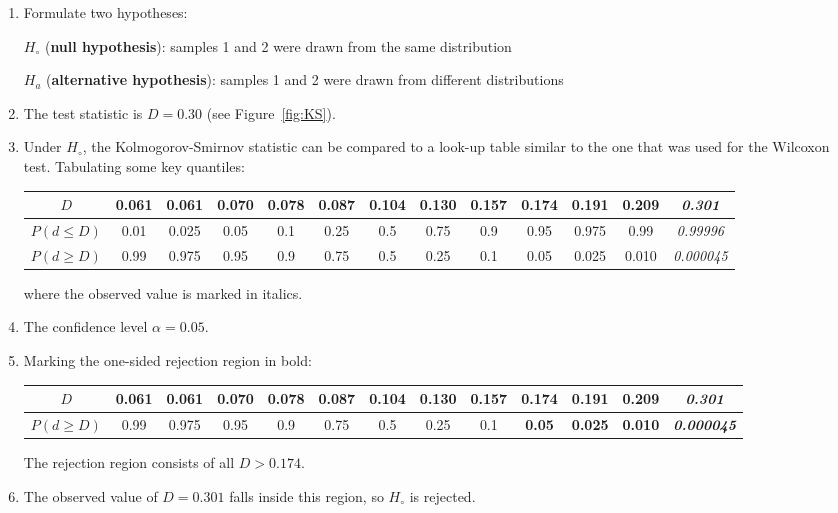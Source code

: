 \begin{enumerate}
\item  Formulate two hypotheses:

  $H_\circ$ (\textbf{null hypothesis}):
  samples 1 and 2 were drawn from the same distribution

  $H_a$ (\textbf{alternative hypothesis}):
  samples 1 and 2 were drawn from different distributions
  
\item The test statistic is $D=0.30$ (see Figure~\ref{fig:KS}).

\item Under $H_\circ$, the Kolmogorov-Smirnov statistic can be
  compared to a look-up table similar to the one that was used for the
  Wilcoxon test. Tabulating some key quantiles:
  \begin{center}
    \begin{tabular}{c|c@{\gap}c@{\gap}c@{\gap}c@{\gap}
        c@{\gap}c@{\gap}c@{\gap}c@{\gap}c@{\gap}c@{\gap}c@{\gap}c}
      $D$ & 0.061 & 0.061 & 0.070 & 0.078 & 0.087 & 0.104 &
      0.130 & 0.157 & 0.174 & 0.191 & 0.209 & \textit{0.301}\\ \hline
      $P(d\leq{D})$ & 0.01 & 0.025 & 0.05 & 0.1 & 0.25 &
      0.5 & 0.75 & 0.9 & 0.95 & 0.975 & 0.99 & \textit{0.99996}\\
      $P(d\geq{D})$ & 0.99 & 0.975 & 0.95 & 0.9 & 0.75 & 0.5 &
      0.25 & 0.1 & 0.05 & 0.025 & 0.010 & \textit{0.000045}
    \end{tabular}
  \end{center}

  \noindent where the observed value is marked in italics.
  
\item The confidence level $\alpha = 0.05$.

\item Marking the one-sided rejection region in bold:
  \begin{center}
    \begin{tabular}{c|c@{\gap}c@{\gap}c@{\gap}c@{\gap}
        c@{\gap}c@{\gap}c@{\gap}c@{\gap}c@{\gap}c@{\gap}c@{\gap}c}
      $D$ & 0.061 & 0.061 & 0.070 & 0.078 & 0.087 & 0.104 &
      0.130 & 0.157 & \textbf{0.174} & \textbf{0.191} &
      \textbf{0.209} & \textbf{\textit{0.301}}\\ \hline
      $P(d\geq{D})$ & 0.99 & 0.975 & 0.95 & 0.9 & 0.75 & 0.5 &
      0.25 & 0.1 & \textbf{0.05} & \textbf{0.025} & \textbf{0.010} &
      \textbf{\textit{0.000045}}
    \end{tabular}
  \end{center}

  The rejection region consists of all $D>{0.174}$.

\item The observed value of $D=0.301$ falls inside this region, so
  $H_\circ$ is rejected.

\end{enumerate}

